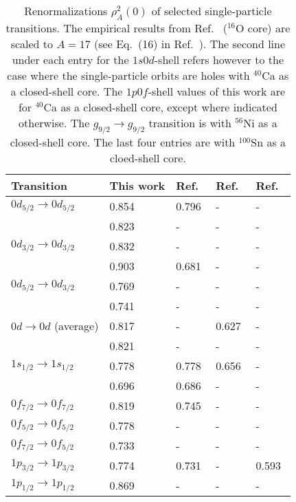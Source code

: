 \begin{table}
  \caption{Renormalizations $\rho^2_A(0)$ of selected single-particle 
    transitions.
    The empirical results from Ref.\ \protect\cite{bro87} ($^{16}$O core) 
    are scaled to $A=17$ 
    (see Eq.\ (16) in Ref.\ \protect\cite{bro87}). The second line under each 
    entry for the $1s0d$-shell refers however to the case 
    where the single-particle orbits are holes with $^{40}$Ca 
    as a closed-shell core. The $1p0f$-shell values
    of this work are for $^{40}$Ca as a closed-shell core, except where
    indicated otherwise. The $g_{9/2}\to
    g_{9/2}$ transition is with $^{56}$Ni as a closed-shell core. The last
    four entries are with $^{100}$Sn as a cloed-shell core.}
  \begin{tabular}{lllll}
    Transition & This work & 
    Ref.\ \protect\cite{tow87} & Ref.\ \protect\cite{bro87} &
    Ref.\ \protect\cite{sem96} \\
    \hline
    $0d_{5/2}\to 0d_{5/2}$ & 0.854 & 0.796\tablenotemark[1] & - & -\\
                          & 0.823 & - & - & - \\
    $0d_{3/2}\to 0d_{3/2}$ & 0.832 & - & - & - \\
                          & 0.903 & 0.681\tablenotemark[1] & - & - \\
    $0d_{5/2}\to 0d_{3/2}$ & 0.769 & - & - & -\\
                          & 0.741 & - & - & - \\
    $0d\to 0d$ (average) & 0.817 & - & 0.627 & - \\
                          & 0.821 & - & - & - \\
    $1s_{1/2}\to 1s_{1/2}$ & 0.778 & 0.778\tablenotemark[1] & 0.656 & - \\
                          & 0.696  & 0.686\tablenotemark[1] & - & - \\
    $0f_{7/2}\to 0f_{7/2}$ & 0.819 & 0.745\tablenotemark[1] & - & - \\
    $0f_{5/2}\to 0f_{5/2}$ & 0.778 & - & - & - \\
    $0f_{7/2}\to 0f_{5/2}$ & 0.733 & - & - & - \\
    $1p_{3/2}\to 1p_{3/2}$ & 0.774 & 0.731\tablenotemark[1] & - & 0.593 \\
    $1p_{1/2}\to 1p_{1/2}$ & 0.869 & - & - & - \\

\end{tabular}
\end{table}
